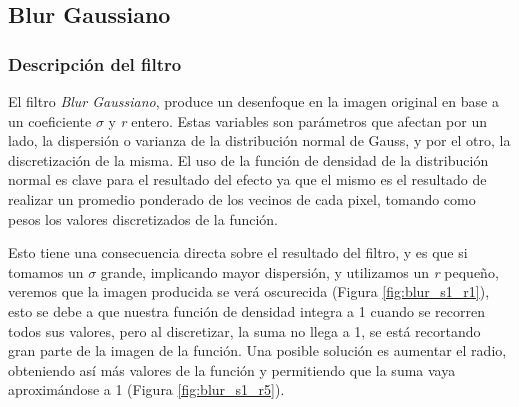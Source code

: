 \subsection{Blur Gaussiano}

\subsubsection{Descripción del filtro}

El filtro \textit{Blur Gaussiano}, produce un desenfoque en la imagen original
en base a un coeficiente $\sigma$ y \textit{r} entero. Estas variables son
parámetros que afectan por un lado, la dispersión o varianza de la distribución
normal de Gauss, y por el otro, la discretización de la misma. El uso de la
función de densidad de la distribución normal es clave para el resultado del
efecto ya que el mismo es el resultado de realizar un promedio ponderado de
los vecinos de cada pixel, tomando como pesos los valores discretizados de la
función.

Esto tiene una consecuencia directa sobre el resultado del filtro, y es que si
tomamos un $\sigma$ grande, implicando mayor dispersión, y utilizamos un
\textit{r} pequeño, veremos que la imagen producida se verá oscurecida (Figura \ref{fig:blur_s1_r1}), esto
se debe a que nuestra función de densidad integra a 1 cuando se recorren todos
sus valores, pero al discretizar, la suma no llega a 1, se está recortando gran
parte de la imagen de la función. Una posible solución es aumentar el radio,
obteniendo así más valores de la función y permitiendo que la suma vaya
aproximándose a 1 (Figura \ref{fig:blur_s1_r5}).


